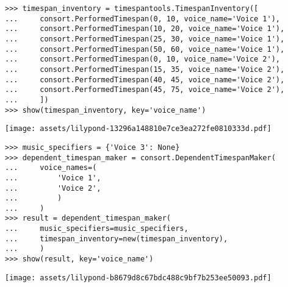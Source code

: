 \begin{singlespacing}
\vspace{-0.5\baselineskip}
\begin{lstlisting}
>>> timespan_inventory = timespantools.TimespanInventory([
...     consort.PerformedTimespan(0, 10, voice_name='Voice 1'),
...     consort.PerformedTimespan(10, 20, voice_name='Voice 1'),
...     consort.PerformedTimespan(25, 30, voice_name='Voice 1'),
...     consort.PerformedTimespan(50, 60, voice_name='Voice 1'),
...     consort.PerformedTimespan(0, 10, voice_name='Voice 2'),
...     consort.PerformedTimespan(15, 35, voice_name='Voice 2'),
...     consort.PerformedTimespan(40, 45, voice_name='Voice 2'),
...     consort.PerformedTimespan(45, 75, voice_name='Voice 2'),
...     ])
>>> show(timespan_inventory, key='voice_name')
\end{lstlisting}
\noindent\texttt{[image: assets/lilypond-13296a148810e7ce3ea272fe0810333d.pdf]}
\end{singlespacing}

\begin{comment}
<abjad>
music_specifiers = {'Voice 3': None}
dependent_timespan_maker = consort.DependentTimespanMaker(
    voice_names=(
        'Voice 1',
        'Voice 2',
        )
    )
result = dependent_timespan_maker(
    music_specifiers=music_specifiers,
    timespan_inventory=new(timespan_inventory),
    )
show(result, key='voice_name')
</abjad>
\end{comment}

\begin{singlespacing}
\vspace{-0.5\baselineskip}
\begin{lstlisting}
>>> music_specifiers = {'Voice 3': None}
>>> dependent_timespan_maker = consort.DependentTimespanMaker(
...     voice_names=(
...         'Voice 1',
...         'Voice 2',
...         )
...     )
>>> result = dependent_timespan_maker(
...     music_specifiers=music_specifiers,
...     timespan_inventory=new(timespan_inventory),
...     )
>>> show(result, key='voice_name')
\end{lstlisting}
\noindent\texttt{[image: assets/lilypond-b8679d8c67bdc488c9bf7b253ee50093.pdf]}
\end{singlespacing}

\begin{comment}
<abjad>
new_dependent_timespan_maker = new(
    dependent_timespan_maker,
    include_inner_starts=True,
    )
result = new_dependent_timespan_maker(
    music_specifiers=music_specifiers,
    timespan_inventory=new(timespan_inventory),
    )
show(result, key='voice_name')
</abjad>
\end{comment}


